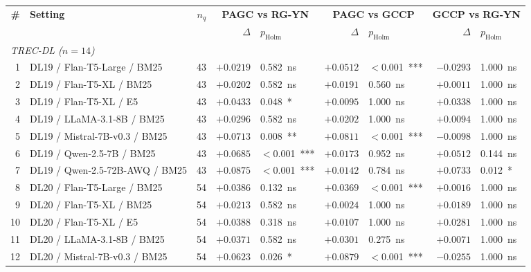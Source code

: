 \documentclass[sigconf]{acmart}
\begin{document}
\begin{table}[t]
\centering
\scriptsize
\setlength{\tabcolsep}{3pt}
\begin{tabular}{rlrrlrlrl}
\toprule
\textbf{\#} & \textbf{Setting} & \textbf{$n_q$}
& \multicolumn{2}{c}{\textbf{PAGC vs RG-YN}}
& \multicolumn{2}{c}{\textbf{PAGC vs GCCP}}
& \multicolumn{2}{c}{\textbf{GCCP vs RG-YN}} \\
\cmidrule(lr){4-5}\cmidrule(lr){6-7}\cmidrule(lr){8-9}
 & & & $\Delta$ & $p_{\text{Holm}}$ & $\Delta$ & $p_{\text{Holm}}$ & $\Delta$ & $p_{\text{Holm}}$ \\
\midrule
\multicolumn{9}{l}{\emph{TREC-DL ($n=14$)}}\\
1  & DL19 / Flan-T5-Large / BM25      & 43  & $+0.0219$ & 0.582~ns       & $+0.0512$ & $<$0.001~*** & $-0.0293$ & 1.000~ns \\
2  & DL19 / Flan-T5-XL / BM25         & 43  & $+0.0202$ & 0.582~ns       & $+0.0191$ & 0.560~ns     & $+0.0011$ & 1.000~ns \\
3  & DL19 / Flan-T5-XL / E5           & 43  & $+0.0433$ & 0.048~*        & $+0.0095$ & 1.000~ns     & $+0.0338$ & 1.000~ns \\
4  & DL19 / LLaMA-3.1-8B / BM25       & 43  & $+0.0296$ & 0.582~ns       & $+0.0202$ & 1.000~ns     & $+0.0094$ & 1.000~ns \\
5  & DL19 / Mistral-7B-v0.3 / BM25    & 43  & $+0.0713$ & 0.008~**       & $+0.0811$ & $<$0.001~*** & $-0.0098$ & 1.000~ns \\
6  & DL19 / Qwen-2.5-7B / BM25        & 43  & $+0.0685$ & $<$0.001~***   & $+0.0173$ & 0.952~ns     & $+0.0512$ & 0.144~ns \\
7  & DL19 / Qwen-2.5-72B-AWQ / BM25   & 43  & $+0.0875$ & $<$0.001~***   & $+0.0142$ & 0.784~ns     & $+0.0733$ & 0.012~*  \\
8  & DL20 / Flan-T5-Large / BM25      & 54  & $+0.0386$ & 0.132~ns       & $+0.0369$ & $<$0.001~*** & $+0.0016$ & 1.000~ns \\
9  & DL20 / Flan-T5-XL / BM25         & 54  & $+0.0213$ & 0.582~ns       & $+0.0024$ & 1.000~ns     & $+0.0189$ & 1.000~ns \\
10 & DL20 / Flan-T5-XL / E5           & 54  & $+0.0388$ & 0.318~ns       & $+0.0107$ & 1.000~ns     & $+0.0281$ & 1.000~ns \\
11 & DL20 / LLaMA-3.1-8B / BM25       & 54  & $+0.0371$ & 0.582~ns       & $+0.0301$ & 0.275~ns     & $+0.0071$ & 1.000~ns \\
12 & DL20 / Mistral-7B-v0.3 / BM25    & 54  & $+0.0623$ & 0.026~*        & $+0.0879$ & $<$0.001~*** & $-0.0255$ & 1.000~ns \\

\end{tabular}
\end{table}
\end{document}
